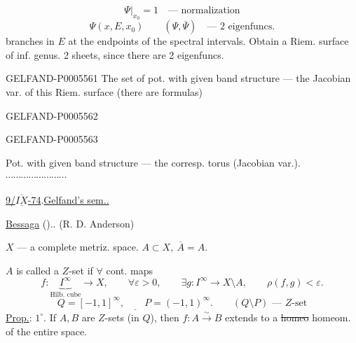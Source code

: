\[
\left.\Psi\right|_{x_0}=1 \quad\text{— normalization}
\]
\[
\Psi(x,E,x_0)\qquad (\Psi,\overline\Psi)\quad\text{— 2 eigenfuncs.}
\]
branches in \(E\) at the endpoints of the spectral intervals. Obtain a Riem. surface of inf. genus. 2 sheets, since there are 2 eigenfuncs.


\begin{GelfandAdjacentEvidence}{GELFAND-P000556}{1}
The set of pot. with given band structure — the Jacobian var. of this Riem. surface (there are formulas)
\end{GelfandAdjacentEvidence}
\begin{GelfandAdjacentEvidence}{GELFAND-P000556}{2}

\end{GelfandAdjacentEvidence}
\begin{GelfandAdjacentEvidence}{GELFAND-P000556}{3}

Pot. with given band structure — the corresp. torus (Jacobian var.).
\hfill\(\cdots\cdots\cdots\cdots\cdots\cdots\cdots\cdots\)\par

\uline{9/\mbox{$\overline{\underline{IX}}$}-74}\enspace.\qquad\uline{Gelfand’s sem..}

\uline{Bessaga} ().\quad {}.
\hfill (R. D. Anderson)\par
\(X\) — a complete metriz. space. \quad \(A\subset X,\ \overline{A}=A\).

\(A\) is called a \(Z\)-set if \(\forall\) cont. maps
\[
f:\underbrace{I^\infty}_{\text{Hilb. cube}}\longrightarrow X,\qquad
\forall\varepsilon>0,\qquad
\exists g:I^\infty\longrightarrow X\setminus A,\qquad
\rho(f,g)<\varepsilon.
\]
\[
\underline{Q=[-1,1]^\infty,\qquad P=(-1,1)^\infty.}
\qquad(Q\setminus P)\text{ — \(Z\)-set}
\]
\uline{Prop.}: \(1^\circ\). If \(A,B\) are \(Z\)-sets (in \(Q\)),
then \(f:A\xrightarrow{\sim} B\) extends to a \sout{homeo} homeom. of the entire space.
\end{GelfandAdjacentEvidence}
